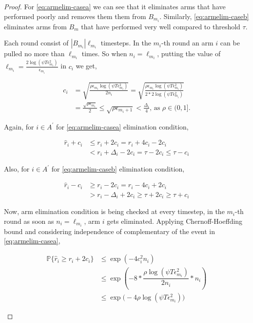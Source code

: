 \begin{proof}
For \ref{eq:armelim-casea} we can see that it eliminates arms that have performed poorly and removes them them from $B_{m_{i}}$. Similarly, \ref{eq:armelim-caseb} eliminates arms from $B_{m}$ that have performed very well compared to threshold $\tau$.

Each round consist of $|B_{m_{i}}|\ell_{m_{i}}$ timesteps. In the $m_{i}$-th round an arm $i$ can be pulled no more than $\ell_{m_{i}}$ times. So when $n_{i}=\ell_{m_{i}}$, putting the value of $\ell_{m_{i}}=\frac{2\log{(\psi T\epsilon_{m_{i}}^{2})}}{\epsilon_{m_{i}}}$ in $c_{i}$ we get, 
\begin{small}
\begin{align*}
c_{i}&=\sqrt{\frac{\rho\epsilon_{m_{i}}\log (\psi T\epsilon_{m_{i}}^{2})}{2 n_{i}}}
=\sqrt{\frac{\rho\epsilon_{m_{i}}\log (\psi T\epsilon_{m_{i}}^{2})}{2*2 \log(\psi T\epsilon_{m_{i}}^{2})}}\\
& =\frac{\sqrt{\rho\epsilon_{m_{i}}}}{2}
 \leq \sqrt{\rho\epsilon_{m_{i}+1}} < \frac{\Delta_{i}}{4} \text{, as }\rho\in (0,1].
\end{align*}
\end{small}


Again, for ${i} \in A^{'}$ for \ref{eq:armelim-casea} elimination condition, 
\begin{small}
\begin{align*}
\hat{r}_{i} + c_{i}&\leq r_{i} + 2c_{i} = r_{i} + 4c_{i} - 2c_{i} \\
&< r_{i} + \Delta_{i} - 2c_{i} = \tau -2c_{i} \leq \tau - c_{i}
\end{align*}
\end{small}


Also, for ${i} \in A^{'}$ for \ref{eq:armelim-caseb} elimination condition, 
\begin{small}
\begin{align*}
\hat{r}_{i} - c_{i}&\geq r_{i} - 2c_{i} = r_{i} - 4c_{i} + 2c_{i} \\
&> r_{i} - \Delta_{i} + 2c_{i}\geq \tau + 2c_{i} \geq \tau + c_{i}
\end{align*}
\end{small}


Now, arm elimination condition is being checked at every timestep, in the $m_{i}$-th round as soon as $n_{i}=\ell_{m_{i}}$, arm $i$ gets eliminated. Applying Chernoff-Hoeffding bound and considering independence of complementary of the event in \ref{eq:armelim-casea},
\begin{small}
\begin{align*}
\mathbb{P}\lbrace\hat{r}_{i}\geq r_{i} + 2c_{i}\rbrace &\leq \exp(-4 c_{i}^{2}n_{i})\\
&\leq \exp(-8 * \dfrac{\rho\log (\psi T\epsilon_{m_{i}}^{2})}{2 n_{i}} *n_{i})\\
&\leq \exp\big(-4\rho\log (\psi T\epsilon_{m_{i}}^{2})\big)
\end{align*}
\end{small}
  

\end{proof}
